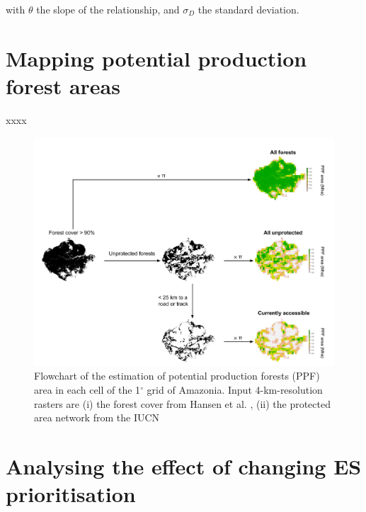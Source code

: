 \documentclass{article}
\begin{document}
with $\theta$ the slope of the relationship, and $\sigma_D$ the standard deviation. 


\clearpage

\section{Mapping potential production forest areas}

\label{sec:defPPF}

xxxx

\begin{figure}
    \centering
    \includegraphics[width=\linewidth]{graphs/PPFareaDiagram.pdf}
    \caption{Flowchart of the estimation of potential production forests (PPF) area in each cell of the 1$^{\circ}$ grid of Amazonia. Input 4-km-resolution rasters are (i) the forest cover from Hansen et al. \cite{Hansen2013}, (ii) the protected area network from the IUCN \cite{WDPA2016} }
    \label{fig:my_label}
\end{figure}

\clearpage

\section{Analysing the effect of changing ES prioritisation}
\label{supsec:changeCost}
\end{document}
